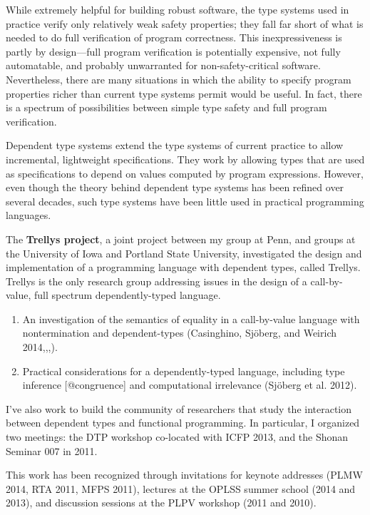 \documentclass[]{article}
\begin{document}
While extremely helpful for building robust software, the type systems
used in practice verify only relatively weak safety properties; they
fall far short of what is needed to do full verification of program
correctness. This inexpressiveness is partly by design---full program
verification is potentially expensive, not fully automatable, and
probably unwarranted for non-safety-critical software. Nevertheless,
there are many situations in which the ability to specify program
properties richer than current type systems permit would be useful. In
fact, there is a spectrum of possibilities between simple type safety
and full program verification.

Dependent type systems extend the type systems of current practice to
allow incremental, lightweight specifications. They work by allowing
types that are used as specifications to depend on values computed by
program expressions. However, even though the theory behind dependent
type systems has been refined over several decades, such type systems
have been little used in practical programming languages.

The \textbf{Trellys project}, a joint project between my group at Penn,
and groups at the University of Iowa and Portland State University,
investigated the design and implementation of a programming language
with dependent types, called Trellys. Trellys is the only research group
addressing issues in the design of a call-by-value, full spectrum
dependently-typed language.

\begin{enumerate}[1.]
\item
  An investigation of the semantics of equality in a call-by-value
  language with nontermination and dependent-types (Casinghino, Sjöberg,
  and Weirich 2014,,,).
\item
  Practical considerations for a dependently-typed language, including
  type inference {[}@congruence{]} and computational irrelevance
  (Sjöberg et al. 2012).
\end{enumerate}

I've also work to build the community of researchers that study the
interaction between dependent types and functional programming. In
particular, I organized two meetings: the DTP workshop co-located with
ICFP 2013, and the Shonan Seminar 007 in 2011.

This work has been recognized through invitations for keynote addresses
(PLMW 2014, RTA 2011, MFPS 2011), lectures at the OPLSS summer school
(2014 and 2013), and discussion sessions at the PLPV workshop (2011 and
2010).
\end{document}
